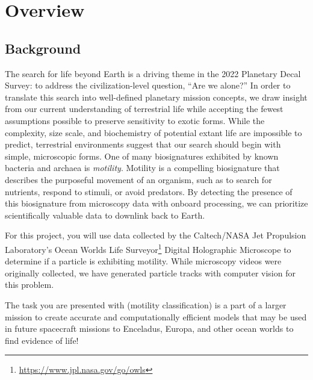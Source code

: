 \newif\ifshowsolutions
\showsolutionstrue


\usepackage{hyperref}
\usepackage{parskip}



\pagestyle{fancy}

\section{Overview}

\subsection{Background}

The search for life beyond Earth is a driving theme in the 2022 Planetary Decal Survey: to address the civilization-level question, ``Are we alone?'' In order to translate this search into well-defined planetary mission concepts, we draw insight from our current understanding of terrestrial life while accepting the fewest assumptions possible to preserve sensitivity to exotic forms. While the complexity, size scale, and biochemistry of potential extant life are impossible to predict, terrestrial environments suggest that our search should begin with simple, microscopic forms. One of many biosignatures exhibited by known bacteria and archaea is \textit{motility}. Motility is a compelling biosignature that describes the purposeful movement of an organism, such as to search for nutrients, respond to stimuli, or avoid predators. By detecting the presence of this biosignature from microscopy data with onboard processing, we can prioritize scientifically valuable data to downlink back to Earth.

For this project, you will use data collected by the Caltech/NASA Jet Propulsion Laboratory's Ocean Worlds Life Surveyor\footnote{\url{https://www.jpl.nasa.gov/go/owls}} Digital Holographic Microscope to determine if a particle is exhibiting motility. While microscopy videos were originally collected, we have generated particle tracks with computer vision for this problem.

The task you are presented with (motility classification) is a part of a larger mission to create accurate and computationally efficient models that may be used in future spacecraft missions to Enceladus, Europa, and other ocean worlds to find evidence of life!

